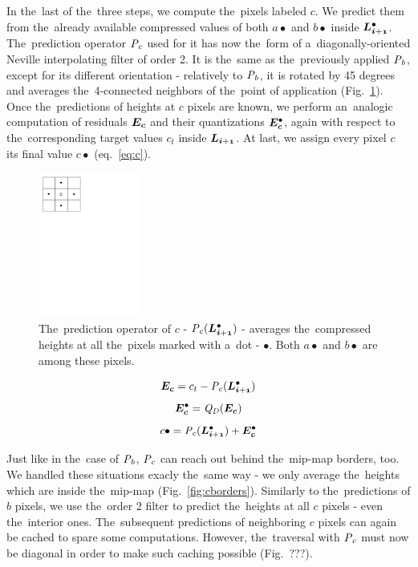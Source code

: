 In the~last of the~three steps, we compute the~pixels labeled $c$. We predict them from the~already available compressed values of both $a\bullet$ and $b\bullet$ inside $\ldot{i+1}$. The~prediction operator $\mathit{P_{c}}$ used for it has now the~form of a~diagonally-oriented Neville interpolating filter of order 2. It is the~same as the~previously applied $\mathit{P_{b}}$, except for its different orientation - relatively to $\mathit{P_{b}}$, it is rotated by 45 degrees and averages the~4-connected neighbors of the~point of application (Fig.~\ref{fig:ccomp}). Once the~predictions of heights at $c$ pixels are known, we perform an~analogic computation of residuals $\objnorm{E}{c}$ and their quantizations $\objdot{E}{c}$, again with respect to the~corresponding target values $c_t$ inside $\lnorm{i+1}$. At last, we assign every pixel $c$ its final value $c\bullet$ (eq.~\ref{eq:c}).

\begin{figure}
	\includegraphics[trim={0 21cm 10cm 0}, clip, width=0.3\textwidth]{figures/ccomp.pdf}\centering
	\caption{The~prediction operator of $c$ - $\opnorm{P}{c}(\ldot{i+1})$ - averages the~compressed heights at all the~pixels marked with a~dot - $\bullet$. Both $a\bullet$ and $b\bullet$ are among these pixels.}
	\label{fig:ccomp}
\end{figure}

$$\objnorm{E}{c} = c_t - \opnorm{P}{c}(\ldot{i+1})$$
$$\objdot{E}{c} = \opnorm{Q}{D}(\objnorm{E}{c})$$
\begin{equation}
\label{eq:c}
c\bullet = \opnorm{P}{c}(\ldot{i+1}) + \objdot{E}{c}
\end{equation}

Just like in the~case of $\mathit{P_{b}}$, $\mathit{P_{c}}$ can reach out behind the~mip-map borders, too. We handled these situations exacly the~same way - we only average the~heights which are inside the~mip-map (Fig.~\ref{fig:cborders}). Similarly to the~predictions of $b$ pixels, we use the~order 2 filter to predict the~heights at all $c$ pixels - even the~interior ones. The~subsequent predictions of neighboring $c$ pixels can again be cached to spare some computations. However, the~traversal with $\mathit{P_{c}}$ must now be diagonal in order to make such caching possible (Fig.~???).

